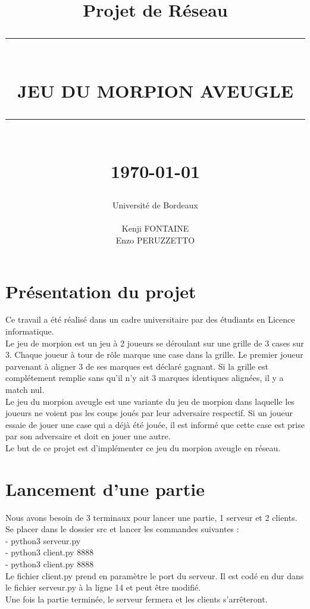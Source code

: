 \documentclass[11pt]{report}
\newcommand{\HRule}[1]{\rule{\linewidth}{#1}}
\begin{document}
\title
{
	\Large{Projet de Réseau}
	\HRule{2pt} \\ [0.5cm]
	\LARGE \textbf{\uppercase{Jeu du Morpion Aveugle}}
	\HRule{2pt} \\ [0.5cm]
	\normalsize \today
}

\date{}

\author
{
	\LARGE{Université de Bordeaux} \\
	\\
    Kenji FONTAINE \\
    Enzo PERUZZETTO \\
}

\maketitle


\section{Présentation du projet}

Ce travail a été réalisé dans un cadre universitaire par des étudiants en
Licence informatique. \\
Le jeu de morpion est un jeu à 2 joueurs se déroulant sur une grille de
3 cases sur 3. Chaque joueur à tour de rôle marque une case dans la grille.
Le premier joueur parvenant à aligner 3 de ses marques est déclaré gagnant.
Si la grille est complétement remplie sans qu'il n'y ait 3 marques identiques
alignées, il y a match nul. \\
Le jeu du morpion aveugle est une variante du jeu de morpion dans laquelle
les joueurs ne voient pas les coups joués par leur adversaire respectif.
Si un joueur essaie de jouer une case qui a déjà été jouée, il est
informé que cette case est prise par son adversaire et doit en jouer une autre. \\
Le but de ce projet est d'implémenter ce jeu du morpion aveugle en réseau.

\section{Lancement d'une partie}

Nous avons besoin de 3 terminaux pour lancer une partie, 1 serveur et 2 clients.
Se placer dans le dossier src et lancer les commandes suivantes : \\
- python3 serveur.py \\
- python3 client.py 8888 \\
- python3 client.py 8888 \\
Le fichier client.py prend en paramètre le port du serveur. Il est codé en dur
dans le fichier serveur.py à la ligne 14 et peut être modifié. \\
Une fois la partie terminée, le serveur fermera et les clients s'arrêteront.
\end{document}
